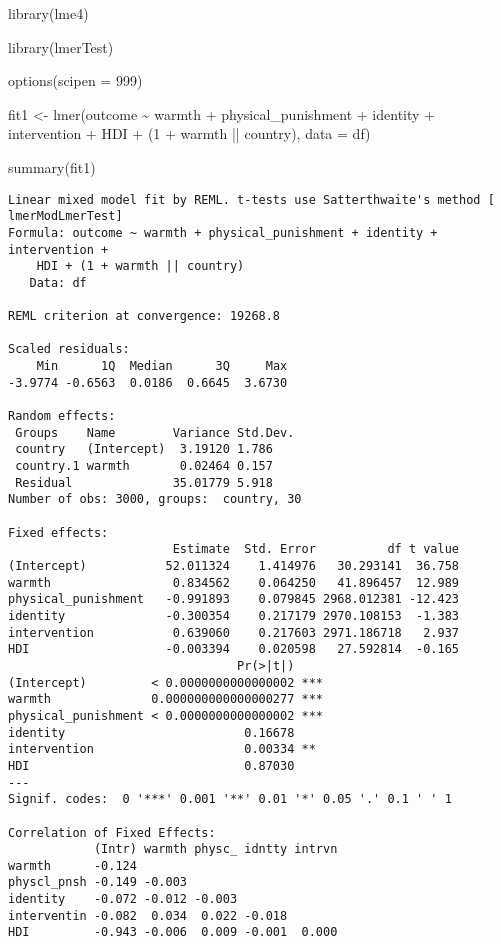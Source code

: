 \documentclass[
  letterpaper,
  DIV=11,
  numbers=noendperiod]{scrreprt}
\newenvironment{Shaded}{\begin{snugshade}}{\end{snugshade}}
\newcommand{\AttributeTok}[1]{\textcolor[rgb]{0.40,0.45,0.13}{#1}}
\newcommand{\DecValTok}[1]{\textcolor[rgb]{0.68,0.00,0.00}{#1}}
\newcommand{\FunctionTok}[1]{\textcolor[rgb]{0.28,0.35,0.67}{#1}}
\newcommand{\NormalTok}[1]{\textcolor[rgb]{0.00,0.23,0.31}{#1}}
\newcommand{\OtherTok}[1]{\textcolor[rgb]{0.00,0.23,0.31}{#1}}
\newcommand{\SpecialCharTok}[1]{\textcolor[rgb]{0.37,0.37,0.37}{#1}}
\begin{document}
\begin{Shaded}
\begin{Highlighting}[]
\FunctionTok{library}\NormalTok{(lme4) }

\FunctionTok{library}\NormalTok{(lmerTest)}

\FunctionTok{options}\NormalTok{(}\AttributeTok{scipen =} \DecValTok{999}\NormalTok{) }

\NormalTok{fit1 }\OtherTok{\textless{}{-}} \FunctionTok{lmer}\NormalTok{(outcome }\SpecialCharTok{\textasciitilde{}}\NormalTok{ warmth }\SpecialCharTok{+}\NormalTok{ physical\_punishment }\SpecialCharTok{+} 
\NormalTok{               identity }\SpecialCharTok{+}\NormalTok{ intervention }\SpecialCharTok{+}\NormalTok{ HDI }\SpecialCharTok{+}
\NormalTok{               (}\DecValTok{1} \SpecialCharTok{+}\NormalTok{ warmth }\SpecialCharTok{||}\NormalTok{ country),}
             \AttributeTok{data =}\NormalTok{ df)}

\FunctionTok{summary}\NormalTok{(fit1)}
\end{Highlighting}
\end{Shaded}

\begin{verbatim}
Linear mixed model fit by REML. t-tests use Satterthwaite's method [
lmerModLmerTest]
Formula: outcome ~ warmth + physical_punishment + identity + intervention +  
    HDI + (1 + warmth || country)
   Data: df

REML criterion at convergence: 19268.8

Scaled residuals: 
    Min      1Q  Median      3Q     Max 
-3.9774 -0.6563  0.0186  0.6645  3.6730 

Random effects:
 Groups    Name        Variance Std.Dev.
 country   (Intercept)  3.19120 1.786   
 country.1 warmth       0.02464 0.157   
 Residual              35.01779 5.918   
Number of obs: 3000, groups:  country, 30

Fixed effects:
                       Estimate  Std. Error          df t value
(Intercept)           52.011324    1.414976   30.293141  36.758
warmth                 0.834562    0.064250   41.896457  12.989
physical_punishment   -0.991893    0.079845 2968.012381 -12.423
identity              -0.300354    0.217179 2970.108153  -1.383
intervention           0.639060    0.217603 2971.186718   2.937
HDI                   -0.003394    0.020598   27.592814  -0.165
                                Pr(>|t|)    
(Intercept)         < 0.0000000000000002 ***
warmth              0.000000000000000277 ***
physical_punishment < 0.0000000000000002 ***
identity                         0.16678    
intervention                     0.00334 ** 
HDI                              0.87030    
---
Signif. codes:  0 '***' 0.001 '**' 0.01 '*' 0.05 '.' 0.1 ' ' 1

Correlation of Fixed Effects:
            (Intr) warmth physc_ idntty intrvn
warmth      -0.124                            
physcl_pnsh -0.149 -0.003                     
identity    -0.072 -0.012 -0.003              
interventin -0.082  0.034  0.022 -0.018       
HDI         -0.943 -0.006  0.009 -0.001  0.000
\end{verbatim}
\end{document}
